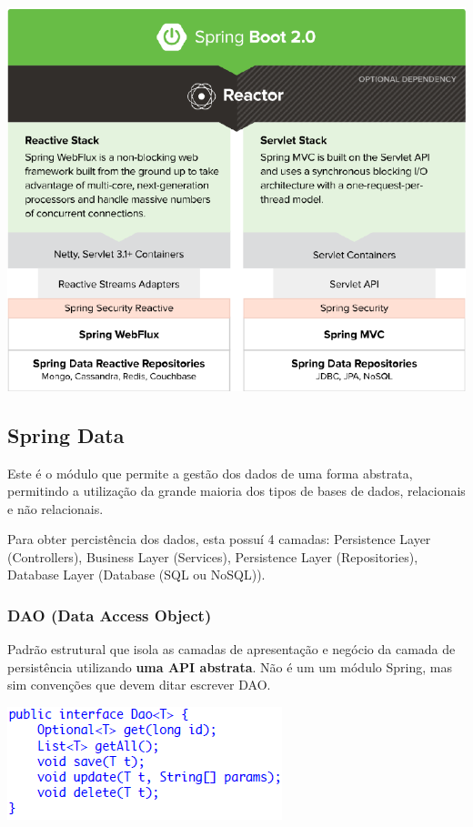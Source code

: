 \documentclass{article}
\begin{document}
\begin{center}
  \includegraphics[scale=0.4]{99}
\end{center}

\subsection{Spring Data}

Este é o módulo que permite a gestão dos dados de uma forma abstrata, permitindo a
utilização da grande maioria dos tipos de bases de dados, relacionais e não relacionais.

\vspace{2mm}

Para obter percistência dos dados, esta possuí 4 camadas:
Persistence Layer (Controllers), Business Layer (Services),
Persistence Layer (Repositories), Database Layer (Database (SQL ou NoSQL)).

\pagebreak

\subsubsection{DAO (Data Access Object)}

Padrão estrutural que isola as camadas de apresentação e negócio
da camada de persistência utilizando \textbf{uma API abstrata}.
Não é um um módulo Spring, mas sim convenções
que devem ditar escrever DAO.

\begin{center}
  \includegraphics[scale=0.6]{100}
\end{center}
\end{document}
